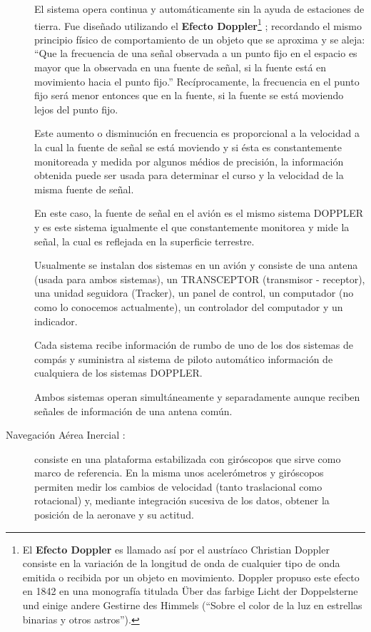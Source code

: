 \begin{description}
El sistema opera continua y autom\'aticamente sin la ayuda de estaciones de tierra. Fue dise\~nado utilizando el \textbf{Efecto Doppler}\footnote{ El \textbf{Efecto Doppler} es llamado as\'i por el austr\'iaco Christian Doppler consiste en la variaci\'on de la longitud de onda de cualquier tipo de onda emitida o recibida por un objeto en movimiento. Doppler propuso este efecto en 1842 en una monograf\'ia titulada Über das farbige Licht der Doppelsterne und einige andere Gestirne des Himmels (``Sobre el color de la luz en estrellas binarias y otros astros''). } ; recordando el mismo principio f\'isico de comportamiento de un objeto que se aproxima y se aleja: ``Que la frecuencia de una se\~nal observada a un punto fijo en el espacio es mayor que la observada en una fuente de se\~nal, si la fuente est\'a en movimiento hacia el punto fijo.''     Rec\'iprocamente, la frecuencia en el punto fijo ser\'a menor entonces que en la fuente, si la fuente se est\'a moviendo lejos del punto fijo.

Este aumento o disminuci\'on en frecuencia es proporcional a la velocidad a la cual la fuente de se\~nal se est\'a moviendo y si \'esta es constantemente monitoreada y medida por algunos m\'edios de precisi\'on, la informaci\'on obtenida puede ser usada para determinar el curso y la velocidad de la misma fuente de se\~nal.

En este caso, la fuente de se\~nal en el avi\'on es el mismo sistema DOPPLER y es este sistema igualmente el que constantemente monitorea y mide la se\~nal, la cual es reflejada en la superficie terrestre.

Usualmente se instalan dos sistemas en un avi\'on y consiste de una antena (usada para ambos sistemas), un TRANSCEPTOR (transmisor - receptor), una unidad seguidora (Tracker), un panel de control, un computador (no como lo conocemos actualmente), un controlador del computador y un indicador.

Cada sistema recibe informaci\'on de rumbo de uno de los dos sistemas de comp\'as y suministra al sistema de piloto autom\'atico informaci\'on de cualquiera de los sistemas DOPPLER.

Ambos sistemas operan simult\'aneamente y separadamente aunque reciben se\~nales de informaci\'on de una antena com\'un.



\item[Navegaci\'on A\'erea Inercial \cite{Salazar_nav_aerea}:] consiste en una plataforma estabilizada con gir\'oscopos que sirve como marco de referencia. En la misma unos aceler\'ometros y gir\'oscopos permiten medir los cambios de velocidad (tanto traslacional como rotacional) y, mediante integraci\'on sucesiva de los datos, obtener la posici\'on de la aeronave y su \gls{actitud}.



\end{description}
